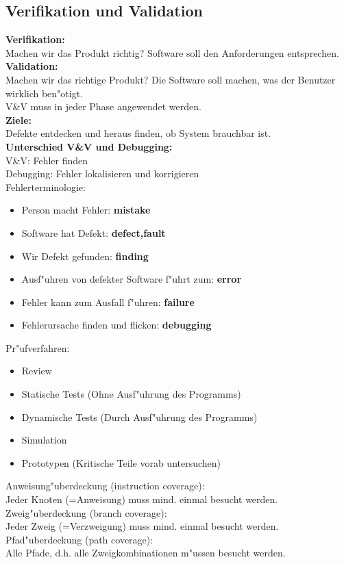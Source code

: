 \subsection{Verifikation und Validation}
\textbf{Verifikation:}\\
Machen wir das Produkt richtig? Software soll den Anforderungen entsprechen.\\
\textbf{Validation:}\\
Machen wir das richtige Produkt? Die Software soll machen, was der Benutzer wirklich ben"otigt.\\
V\&V muss in jeder Phase angewendet werden.\\
\textbf{Ziele:}\\
Defekte entdecken und heraus finden, ob System brauchbar ist.\\
\textbf{Unterschied V\&V und Debugging:}\\
V\&V: Fehler finden\\ 
Debugging: Fehler lokalisieren und korrigieren\\
Fehlerterminologie:\\
\begin{itemize}
\item Person macht Fehler: \textbf{mistake}
\item Software hat Defekt: \textbf{defect,fault}
\item Wir Defekt gefunden: \textbf{finding}
\item Ausf"uhren von defekter Software f"uhrt zum: \textbf{error}
\item Fehler kann zum Ausfall f"uhren: \textbf{failure}
\item Fehlerursache finden und flicken: \textbf{debugging}
\end{itemize}
Pr"ufverfahren:\\
\begin{itemize}
\item Review
\item Statische Tests (Ohne Ausf"uhrung des Programms)
\item Dynamische Tests (Durch Ausf"uhrung des Programms)
\item Simulation
\item Prototypen (Kritische Teile vorab untersuchen)
\end{itemize}

Anweisung"uberdeckung (instruction coverage):\\
Jeder Knoten (=Anweisung) muss mind. einmal besucht werden. 
Zweig"uberdeckung (branch coverage):\\
Jeder Zweig (=Verzweigung) muss mind. einmal besucht werden. 
Pfad"uberdeckung (path coverage):\\
Alle Pfade, d.h. alle Zweigkombinationen m"ussen besucht werden. 

